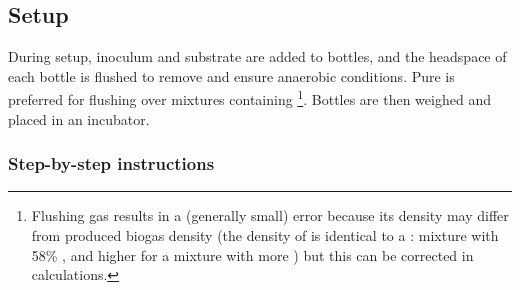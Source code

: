 \documentclass[]{article}
\begin{document}
\subsection{Setup}
During setup, inoculum and substrate are added to bottles, and the headspace of each bottle is flushed to remove  and ensure anaerobic conditions. 
Pure  is preferred for flushing over mixtures containing \footnote{
Flushing gas results in a (generally small) error because its density may differ from produced biogas density (the density of  is identical to a : mixture with 58\% , and higher for a mixture with more ) but this can be corrected in calculations. 
}.
Bottles are then weighed and placed in an incubator.

\subsubsection{Step-by-step instructions}
\end{document}
